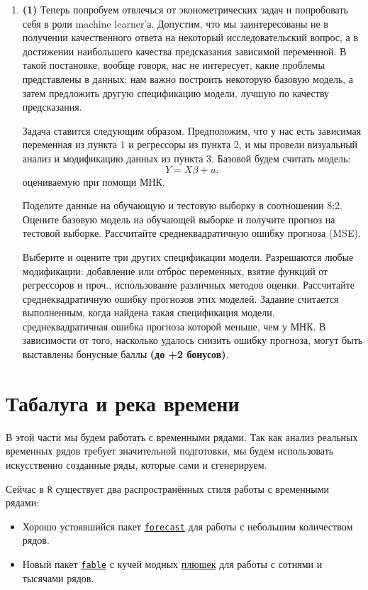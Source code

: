 \documentclass[10pt, a4paper]{extarticle}
\newcommand{\code}[1]{{\tt #1}}
\begin{document}
\begin{enumerate}
	\item \textbf{(1)} Теперь попробуем отвлечься от эконометрических задач и попробовать себя в роли machine learner'а. Допустим, что мы заинтересованы не в получении качественного ответа на некоторый исследовательский вопрос, а в достижении наибольшего качества предсказания зависимой переменной. В такой постановке, вообще говоря, нас не интересует, какие проблемы представлены в данных: нам важно построить некоторую базовую модель, а затем предложить другую спецификацию модели, лучшую по качеству предсказания. 
	
	Задача ставится следующим образом. Предположим, что у нас есть зависимая переменная из пункта 1 и регрессоры из пункта 2, и мы провели визуальный анализ и модификацию данных из пункта 3. Базовой будем считать модель:
	\[
	Y = X\beta + u,
	\]
	оцениваемую при помощи МНК.
	
	Поделите данные на обучающую и тестовую выборку в соотношении 8:2. Оцените базовую модель на обучающей выборке и получите прогноз на тестовой выборке. Рассчитайте среднеквадратичную ошибку прогноза (MSE).
	
	Выберите и оцените три других спецификации модели. Разрешаются любые модификации: добавление или отброс переменных, взятие функций от регрессоров и проч., использование различных методов оценки. Рассчитайте среднеквадратичную ошибку прогнозов этих моделей. Задание считается выполненным, когда найдена такая спецификация модели, среднеквадратичная ошибка прогноза которой меньше, чем у МНК. В зависимости от того, насколько удалось снизить ошибку прогноза, могут быть выставлены бонусные баллы \textbf{(до +2 бонусов)}. 
	
\end{enumerate}

\section{Табалуга и река времени}
В этой части мы будем работать с временными рядами. Так как анализ реальных временных рядов требует значительной подготовки, мы будем использовать искусственно созданные ряды, которые сами и сгенерируем.

Сейчас в \code{R} существует два распространённых стиля работы с временными рядами:
\begin{itemize}
	\item Хорошо устоявшийся пакет \href{https://otexts.com/fpp2/}{\code{forecast}} для работы с небольшим количеством рядов.
	\item Новый пакет \href{https://otexts.com/fpp3/}{\code{fable}} с кучей модных \href{https://education.rstudio.com/blog/2020/02/conf20-ts/}{плюшек} для работы с сотнями и тысячами рядов. 
\end{itemize}
\end{document}
